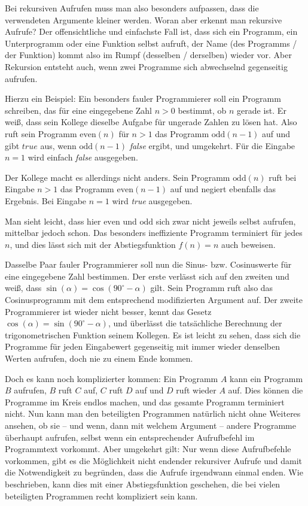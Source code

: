 Bei rekursiven Aufrufen muss man also besonders aufpassen, dass die verwendeten Argumente kleiner werden. Woran aber erkennt man rekursive Aufrufe? Der offensichtliche und einfachste Fall ist, dass sich ein Programm, ein Unterprogramm oder eine Funktion selbst aufruft, der Name (des Programms / der Funktion) kommt also im Rumpf (desselben / derselben) wieder vor. Aber Rekursion entsteht auch, wenn zwei Programme sich abwechselnd gegenseitig aufrufen.

Hierzu ein Beispiel: Ein besonders fauler Programmierer soll ein Programm schreiben, das für eine eingegebene Zahl $n>0$ bestimmt, ob $n$ gerade ist. Er weiß, dass sein Kollege dieselbe Aufgabe für ungerade Zahlen zu lösen hat. Also ruft sein Programm $\text{even} (n)$ für $n>1$ das Programm $\text{odd} (n-1)$ auf und gibt $true$ aus, wenn $\text{odd}(n-1)$ \emph{false} ergibt, und umgekehrt. Für die Eingabe $n=1$ wird einfach \emph{false} ausgegeben.

Der Kollege macht es allerdings nicht anders. Sein Programm $\text{odd}(n)$ ruft bei Eingabe $n>1$ das Programm $\text{even} (n-1)$ auf und negiert ebenfalls das Ergebnis. Bei Eingabe $n=1$ wird \emph{true} ausgegeben.

Man sieht leicht, dass hier $\text{even}$ und $\text{odd}$ sich zwar nicht jeweils selbst aufrufen, mittelbar jedoch schon. Das besonders ineffiziente Programm terminiert für jedes $n$, und dies lässt sich mit der Abstiegsfunktion $f(n) = n$ auch beweisen.

Dasselbe Paar fauler Programmierer soll nun die Sinus- bzw. Cosinuswerte für eine eingegebene Zahl bestimmen. Der erste verlässt sich auf den zweiten und weiß, dass $\sin (\alpha) = \cos (90^\circ - \alpha)$ gilt. Sein Programm ruft also das Cosinusprogramm mit dem entsprechend modifizierten Argument auf. Der zweite Programmierer ist wieder nicht besser, kennt das Gesetz $\cos (\alpha) = \sin(90^\circ - \alpha)$, und überlässt die tatsächliche Berechnung der trigonometrischen Funktion seinem Kollegen. Es ist leicht zu sehen, dass sich die Programme für jeden Eingabewert gegenseitig mit immer wieder denselben Werten aufrufen, doch nie zu einem Ende kommen.

Doch es kann noch komplizierter kommen: Ein Programm $A$ kann ein Programm $B$ aufrufen, $B$ ruft $C$ auf, $C$ ruft $D$ auf und $D$ ruft wieder $A$ auf. Dies können die Programme im Kreis endlos machen, und das gesamte Programm terminiert nicht. Nun kann man den beteiligten Programmen natürlich nicht ohne Weiteres ansehen, ob sie -- und wenn, dann mit welchem Argument -- andere Programme überhaupt aufrufen, selbst wenn ein entsprechender Aufrufbefehl im Programmtext vorkommt. Aber umgekehrt gilt: Nur wenn diese Aufrufbefehle vorkommen, gibt es die Möglichkeit nicht endender rekursiver Aufrufe und damit die Notwendigkeit zu begründen, dass die Aufrufe irgendwann einmal enden. Wie beschrieben, kann dies mit einer Abstiegsfunktion geschehen, die bei vielen beteiligten Programmen recht kompliziert sein kann.


